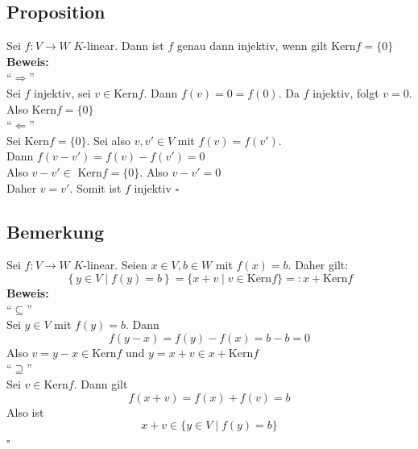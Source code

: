 \subsection{Proposition} %
\label{sub:proposition}
Sei $f : V \to W$ \(K\)-linear. 
Dann ist $f$ genau dann injektiv, wenn gilt Kern$f =  \{ 0\}$ 
\vspace{\baselineskip} \\
\textbf{Beweis:} \\
\enquote{$\Rightarrow$} \\
Sei $f$ injektiv, sei $v \in \text{Kern}f$. Dann $f(v)=0 = f(0)$. Da $f$ injektiv, folgt $v=0$. Also Kern$f= \{ 0\}$
\vspace{\baselineskip} \\
\enquote{$\Leftarrow$} \\
Sei Kern$f = \{0\}$. Sei also $v,v' \in V$ mit $f(v)=f(v')$. \\
Dann $f(v-v')= f(v)-f(v')=0$ 
\vspace{9pt} \\
Also $v-v' \in \text{ Kern} f = \{0\}$. Also $v-v' =0$ \\
Daher $v=v'$. Somit ist $f$ injektiv \hfill $\square$

\subsection{Bemerkung} %
\label{sub:bemerkung}
Sei $f : V \to W$ \(K\)-linear. Seien $x \in V , b \in W$ mit $f(x)=b$. Daher gilt:
\[
	\left\{ y \in V \mid f(y)=b \right\} =  \{ x +v \mid v \in \text{Kern} f \} =: x + \text{Kern} f
\]
\textbf{Beweis:} 
\vspace{\baselineskip} \\
\enquote{$\subseteq$} \\
Sei $y \in V$ mit $f(y)=b$. Dann 
\[
	f(y-x)= f(y)-f(x)= b-b=0
\]
Also $v=y-x \in \text{Kern} f$ und $y=x+v \in x + \text{Kern} f$
\vspace{\baselineskip} \\
\enquote{$\supseteq$} \\
Sei $v \in \text{Kern} f.$ Dann gilt
\[
	f(x+v)= f(x) +f(v) =b
\]
Also ist 
\[
	x+v \in \{ y \in V \mid f(y)=b  \} 
\]
\hfill $\square$


